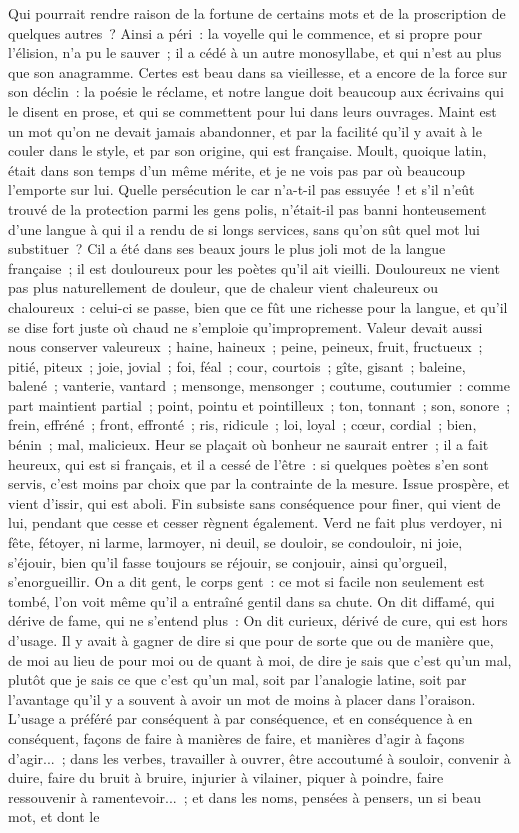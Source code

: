 \documentclass[french,twoside]{book} %
\begin{document}
Qui pourrait rendre raison de la fortune de certains mots et de la proscription de quelques autres ? Ainsi a péri : la voyelle qui le commence, et si propre pour l’élision, n’a pu le sauver ; il a cédé à un autre monosyllabe, et qui n’est au plus que son anagramme. Certes est beau dans sa vieillesse, et a encore de la force sur son déclin : la poésie le réclame, et notre langue doit beaucoup aux écrivains qui le disent en prose, et qui se commettent pour lui dans leurs ouvrages. Maint est un mot qu’on ne devait jamais abandonner, et par la facilité qu’il y avait à le couler dans le style, et par son origine, qui est française. Moult, quoique latin, était dans son temps d’un même mérite, et je ne vois pas par où beaucoup l’emporte sur lui. Quelle persécution le car n’a-t-il pas essuyée ! et s’il n’eût trouvé de la protection parmi les gens polis, n’était-il pas banni honteusement d’une langue à qui il a rendu de si longs services, sans qu’on sût quel mot lui substituer ? Cil a été dans ses beaux jours le plus joli mot de la langue française ; il est douloureux pour les poètes qu’il ait vieilli. Douloureux ne vient pas plus naturellement de douleur, que de chaleur vient chaleureux ou chaloureux : celui-ci se passe, bien que ce fût une richesse pour la langue, et qu’il se dise fort juste où chaud ne s’emploie qu’improprement. Valeur devait aussi nous conserver valeureux ; haine, haineux ; peine, peineux, fruit, fructueux ; pitié, piteux ; joie, jovial ; foi, féal ; cour, courtois ; gîte, gisant ; baleine, balené ; vanterie, vantard ; mensonge, mensonger ; coutume, coutumier : comme part maintient partial ; point, pointu et pointilleux ; ton, tonnant ; son, sonore ; frein, effréné ; front, effronté ; ris, ridicule ; loi, loyal ; cœur, cordial ; bien, bénin ; mal, malicieux. Heur se plaçait où bonheur ne saurait entrer ; il a fait heureux, qui est si français, et il a cessé de l’être : si quelques poètes s’en sont servis, c’est moins par choix que par la contrainte de la mesure. Issue prospère, et vient d’issir, qui est aboli. Fin subsiste sans conséquence pour finer, qui vient de lui, pendant que cesse et cesser règnent également. Verd ne fait plus verdoyer, ni fête, fétoyer, ni larme, larmoyer, ni deuil, se douloir, se condouloir, ni joie, s’éjouir, bien qu’il fasse toujours se réjouir, se conjouir, ainsi qu’orgueil, s’enorgueillir. On a dit gent, le corps gent : ce mot si facile non seulement est tombé, l’on voit même qu’il a entraîné gentil dans sa chute. On dit diffamé, qui dérive de fame, qui ne s’entend plus : On dit curieux, dérivé de cure, qui est hors d’usage. Il y avait à gagner de dire si que pour de sorte que ou de manière que, de moi au lieu de pour moi ou de quant à moi, de dire je sais que c’est qu’un mal, plutôt que je sais ce que c’est qu’un mal, soit par l’analogie latine, soit par l’avantage qu’il y a souvent à avoir un mot de moins à placer dans l’oraison. L'usage a préféré par conséquent à par conséquence, et en conséquence à en conséquent, façons de faire à manières de faire, et manières d’agir à façons d’agir... ; dans les verbes, travailler à ouvrer, être accoutumé à souloir, convenir à duire, faire du bruit à bruire, injurier à vilainer, piquer à poindre, faire ressouvenir à ramentevoir... ; et dans les noms, pensées à pensers, un si beau mot, et dont le 
\end{document}
